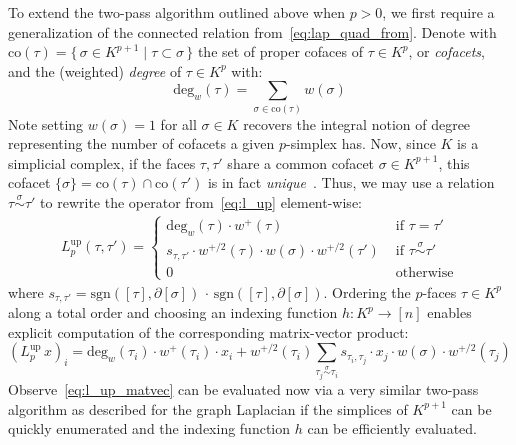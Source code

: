 \documentclass[10pt]{article}
\numberwithin{equation}{section}
\newcommand{\+}{%
	\raisebox{0.18ex}{\scaleobj{0.55}{+}}
}
\theoremstyle{definition}
\theoremstyle{definition}
\begin{document}
To extend the two-pass algorithm outlined above when $p > 0$, we first require a generalization of the connected relation from~\eqref{eq:lap_quad_from}.
 Denote with $\mathrm{co}(\tau) = \{ \, \sigma \in K^{p+1} \mid \tau \subset \sigma \, \}$ the set of proper cofaces of $\tau \in K^p$, or \emph{cofacets}, and the (weighted) \emph{degree} of $\tau \in K^p$ with: 
$$\mathrm{deg}_w(\tau) = \sum_{\sigma \in \mathrm{co}(\tau)} w(\sigma) $$
Note setting $w(\sigma) = 1$ for all $\sigma \in K$ recovers the integral notion of degree representing the number of cofacets a given $p$-simplex has. 
Now, since $K$ is a simplicial complex, if the faces $\tau, \tau'$ share a common cofacet $\sigma \in K^{p+1}$, this cofacet $\{\sigma\} = \mathrm{co}(\tau) \cap \mathrm{co}(\tau')$ is in fact \emph{unique}~\cite{goldberg2002combinatorial}. 
Thus, we may use a relation $\tau \overset{\sigma}{\sim} \tau'$ to rewrite the operator from~\eqref{eq:l_up} element-wise: 
\begin{align}\label{eq:up_laplace_theory}
	 L_p^{\text{up}}(\tau, \tau')= \begin{cases}
		 \mathrm{deg}_w(\tau) \cdot w^{+}(\tau) & \text{ if } \tau = \tau' \\ 
		s_{\tau, \tau'} \cdot  w^{+/2}(\tau) \cdot w(\sigma) \cdot w^{+/2}(\tau') & \text{ if } \tau \overset{\sigma}{\sim} \tau' \\
		0 & \text{ otherwise} 
	\end{cases}
\end{align}
where $s_{\tau, \tau'} = \mathrm{sgn}([\tau], \partial[\sigma]) \, \cdot \, \mathrm{sgn}([\tau], \partial[\sigma])$. Ordering the $p$-faces $\tau \in K^p$ along a total order and choosing an indexing function $h : K^p \to [n]$ enables explicit computation of the corresponding matrix-vector product: 
\begin{equation}\label{eq:l_up_matvec}
	(L_p^{\textrm{up}} \, x)_i =  \mathrm{deg}_w(\tau_i) \cdot w^{+}(\tau_i) \cdot x_i + w^{+/2}(\tau_i) \sum\limits_{\tau_j \overset{\sigma}{\sim} \tau_i} s_{\tau_i, \tau_j} \cdot x_{j} \cdot w(\sigma) \cdot w^{+/2}(\tau_j) 
\end{equation}
Observe~\eqref{eq:l_up_matvec} can be evaluated now via a very similar two-pass algorithm as described for the graph Laplacian if the simplices of $K^{p+1}$ can be quickly enumerated and the indexing function $h$ can be efficiently evaluated.
\end{document}
